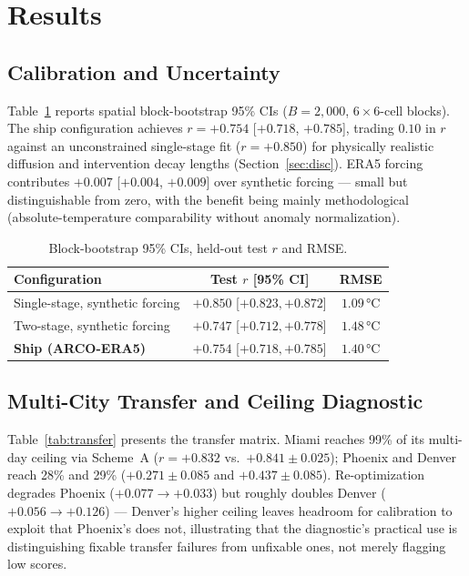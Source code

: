 \documentclass[conference]{IEEEtran}
\begin{document}
\section{Results}
\label{sec:results}

\subsection{Calibration and Uncertainty}
Table~\ref{tab:bootstrap_ci} reports spatial block-bootstrap 95\% CIs
($B{=}2{,}000$, $6{\times}6$-cell blocks). The ship configuration achieves
$r{=}{+}0.754$ [$+0.718$, $+0.785$], trading $0.10$ in $r$ against an
unconstrained single-stage fit ($r{=}{+}0.850$) for physically realistic
diffusion and intervention decay lengths (Section~\ref{sec:disc}). ERA5
forcing contributes $+0.007$ [$+0.004$, $+0.009$] over synthetic forcing —
small but distinguishable from zero, with the benefit being mainly
methodological (absolute-temperature comparability without anomaly
normalization).

\begin{table}[ht]
  \centering
  \caption{Block-bootstrap 95\% CIs, held-out test $r$ and RMSE.}
  \label{tab:bootstrap_ci}
  \scriptsize
  \begin{tabular}{lcc}
    \toprule
    Configuration & Test $r$ [95\% CI] & RMSE \\
    \midrule
    Single-stage, synthetic forcing & $+0.850$ [$+0.823,+0.872$] & $1.09$\,°C \\
    Two-stage, synthetic forcing & $+0.747$ [$+0.712,+0.778$] & $1.48$\,°C \\
    \textbf{Ship (ARCO-ERA5)} & $\mathbf{+0.754}$ [$+0.718,+0.785$] & $\mathbf{1.40}$\,°C \\
    \bottomrule
  \end{tabular}
\end{table}

\subsection{Multi-City Transfer and Ceiling Diagnostic}
Table~\ref{tab:transfer} presents the transfer matrix. Miami reaches 99\%
of its multi-day ceiling via Scheme~A ($r{=}{+}0.832$ vs.\
$+0.841\pm0.025$); Phoenix and Denver reach 28\% and 29\%
($+0.271\pm0.085$ and $+0.437\pm0.085$). Re-optimization degrades Phoenix
($+0.077\to+0.033$) but roughly doubles Denver ($+0.056\to+0.126$) —
Denver's higher ceiling leaves headroom for calibration to exploit that
Phoenix's does not, illustrating that the diagnostic's practical use is
distinguishing fixable transfer failures from unfixable ones, not merely
flagging low scores.
\end{document}
